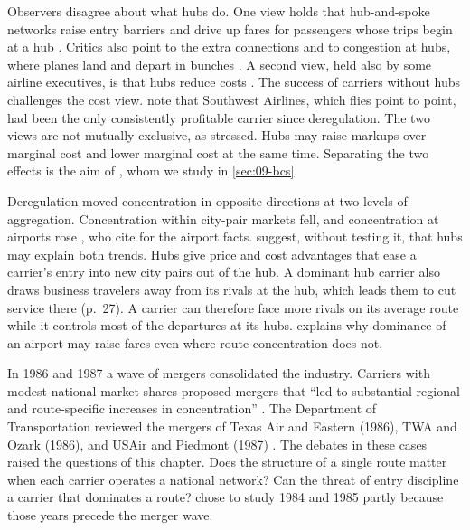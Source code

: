 Observers disagree about what hubs do. One view holds that hub-and-spoke networks raise entry barriers and
drive up fares for passengers whose trips begin at a hub \citep{Borenstein1989,Borenstein1991}. Critics also
point to the extra connections and to congestion at hubs, where planes land and depart in
bunches \citep[p.~1, n.~2]{BerryCarnallSpiller2006}. A second view, held also by some airline executives, is
that hubs reduce costs \citep{CavesChristensenTretheway1984,BruecknerDyerSpiller1992,BruecknerSpiller1994}.
The success of carriers without hubs challenges the cost view. \citet[p.~1, n.~4]{BerryCarnallSpiller2006}
note that Southwest Airlines, which flies point to point, had been the only consistently profitable carrier
since deregulation. The two views are not mutually exclusive, as \citet{Berry1990} stressed. Hubs may raise
markups over marginal cost and lower marginal cost at the same time. Separating the two effects is the aim of
\citet{BerryCarnallSpiller2006}, whom we study in \cref{sec:09-bcs}.

Deregulation moved concentration in opposite directions at two levels of aggregation. Concentration within
city-pair markets fell, and concentration at airports rose
\citep[pp.~3, 27]{BerryCarnallSpiller2006}, who cite \citet{BruecknerSpiller1994} for the airport facts.
\citeauthor{BerryCarnallSpiller2006} suggest, without testing it, that hubs may explain both trends. Hubs
give price and cost advantages that ease a carrier's entry into new city pairs out of the hub. A dominant hub
carrier also draws business travelers away from its rivals at the hub, which leads them to cut service there
(p.~27). A carrier can therefore face more rivals on its average route while it controls most of the
departures at its hubs.  explains why dominance of an airport may raise fares
even where route concentration does not.

In 1986 and 1987 a wave of mergers consolidated the industry. Carriers with modest national market shares
proposed mergers that ``led to substantial regional and route-specific increases in concentration''
\citep[p.~446]{WhinstonCollins1992}. The Department of Transportation reviewed the mergers of
Texas Air and Eastern (1986), TWA and Ozark (1986), and USAir and Piedmont (1987)
\citep[p.~347, n.~14]{Borenstein1989}. The debates in these cases raised the questions of this chapter. Does
the structure of a single route matter when each carrier operates a national network? Can the threat of entry
discipline a carrier that dominates a route? \citet[p.~450]{WhinstonCollins1992} chose to study 1984 and 1985
partly because those years precede the merger wave.

